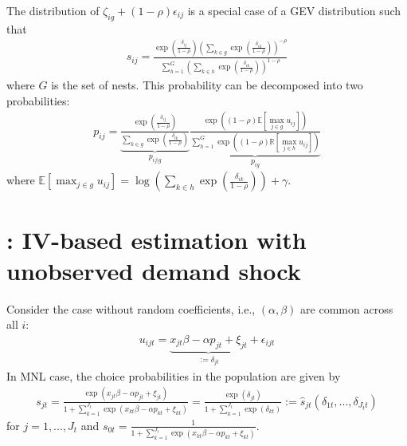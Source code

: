 \documentclass[11pt]{elegantbook}
\begin{document}
The distribution of $\zeta_{ig}+(1-\rho)\epsilon_{ij}$ is a special case of a GEV distribution such that
\begin{equation}
    \begin{aligned}
        s_{ij}=\frac{\exp\left(\frac{\delta_{ij}}{1-\rho}\right)\left(\sum_{k\in g}\exp\left(\frac{\delta_{ik}}{1-\rho}\right)\right)^{-\rho}}{\sum_{h=1}^G\left(\sum_{k\in h}\exp\left(\frac{\delta_{ik}}{1-\rho}\right)\right)^{1-\rho}}
    \end{aligned}
    \nonumber
\end{equation}
where $G$ is the set of nests. This probability can be decomposed into two probabilities:
\begin{equation}
    \begin{aligned}
        p_{ij}=\underbrace{\frac{\exp\left(\frac{\delta_{ij}}{1-\rho}\right)}{\sum_{k\in g}\exp\left(\frac{\delta_{ik}}{1-\rho}\right)}}_{p_{ij|g}}\underbrace{\frac{\exp\left((1-\rho)\mathbb{E}[\max_{j\in g}u_{ij}]\right)}{\sum_{h=1}^G\exp\left((1-\rho)\mathbb{R}[\max_{j\in h}u_{ij}]\right)}}_{p_{ig}}
    \end{aligned}
    \nonumber
\end{equation}
where $\mathbb{E}[\max_{j\in g}u_{ij}]=\log\left(\sum_{k\in h}\exp\left(\frac{\delta_{ik}}{1-\rho}\right)\right)+\gamma$.

\section{\cite{berry1994estimating}: IV-based estimation with unobserved demand shock}
Consider the case without random coefficients, i.e., $(\alpha,\beta)$ are common across all $i$:
\begin{equation}
    \begin{aligned}
        u_{ijt}=\underbrace{x_{jt}\beta-\alpha p_{jt}+\xi_{jt}}_{:=\delta_{jt}}+\epsilon_{ijt}
    \end{aligned}
    \nonumber
\end{equation}
In MNL case, the choice probabilities in the population are given by
\begin{equation}
    \begin{aligned}
        s_{jt}=\frac{\exp(x_{jt}\beta-\alpha p_{jt}+\xi_{jt})}{1+\sum_{k=1}^{J_t}\exp(x_{kt}\beta-\alpha p_{kt}+\xi_{kt})}=\frac{\exp(\delta_{jt})}{1+\sum_{k=1}^{J_t}\exp(\delta_{kt})}:=\hat{s}_{jt}(\delta_{1t},...,\delta_{J_tt})
    \end{aligned}
    \label{eq:s_jt}
\end{equation}
for $j=1,...,J_t$ and $s_{0t}=\frac{1}{1+\sum_{k=1}^{J_t}\exp(x_{kt}\beta-\alpha p_{kt}+\xi_{kt})}$.
\end{document}

